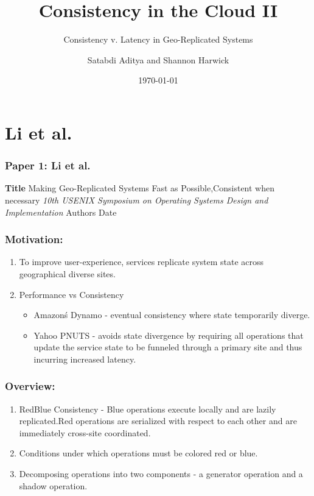 \documentclass{beamer}
\title{Consistency in the Cloud II}
\subtitle{Consistency v. Latency in Geo-Replicated Systems}
\author{Satabdi Aditya and Shannon Harwick}
\institute{University of Illinois at Chicago}
\date{\today}
\begin{document}

\section{Li et al.} 

\begin{frame}
\frametitle{Paper 1: Li et al.}

\textbf{Title} Making Geo-Replicated Systems Fast as Possible,Consistent when necessary\newline
\textit{10th USENIX Symposium on Operating Systems Design and Implementation} \newline
Authors\newline
Date\newline

\end{frame}


\begin{frame}
\frametitle{Motivation:}
\begin{enumerate}
\item To improve user-experience, services replicate  system state across geographical diverse sites.
\item Performance vs Consistency
\begin{itemize}
\item Amazon\'s Dynamo - eventual consistency where state temporarily diverge.
\item Yahoo PNUTS - avoids state divergence by requiring all operations that update the service state to be funneled through a primary site and thus incurring increased latency.
\end{itemize}
\end{enumerate}

\end{frame}



\begin{frame}
\frametitle{Overview:}
\begin{enumerate}
\item RedBlue Consistency - Blue operations execute locally and are lazily replicated.Red operations are serialized with respect to each other and are immediately cross-site coordinated.
\item Conditions under which operations must be colored red or blue.
\item Decomposing operations into two components - a generator operation and a shadow operation.
\end{enumerate}

\end{frame}
\end{document}
